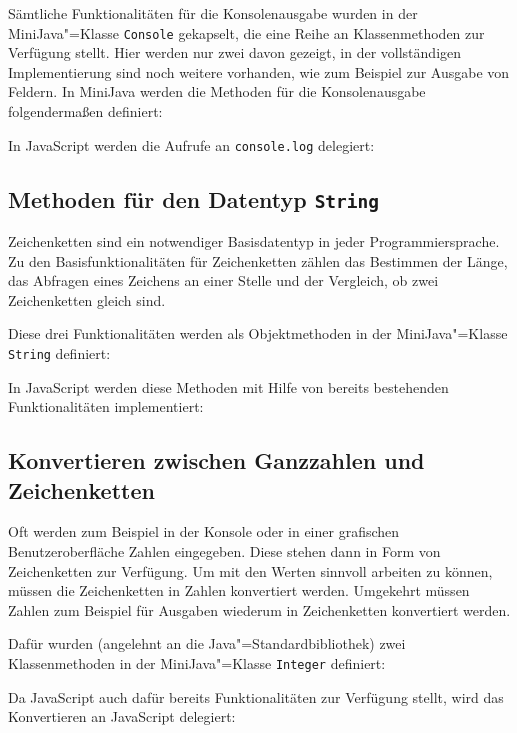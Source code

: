 Sämtliche Funktionalitäten für die Konsolenausgabe wurden in der MiniJava"=Klasse \lstinline{Console} gekapselt, die eine Reihe an Klassenmethoden zur Verfügung stellt. Hier werden nur zwei davon gezeigt, in der vollständigen Implementierung sind noch weitere vorhanden, wie zum Beispiel zur Ausgabe von Feldern. In MiniJava werden die Methoden für die Konsolenausgabe folgendermaßen definiert:


In JavaScript werden die Aufrufe an \lstinline{console.log} delegiert:


\subsection{Methoden für den Datentyp \lstinline{String}}

Zeichenketten sind ein notwendiger Basisdatentyp in jeder Programmiersprache. Zu den Basisfunktionalitäten für Zeichenketten zählen das Bestimmen der Länge, das Abfragen eines Zeichens an einer Stelle und der Vergleich, ob zwei Zeichenketten gleich sind.

Diese drei Funktionalitäten werden als Objektmethoden in der MiniJava"=Klasse \lstinline{String} definiert:


In JavaScript werden diese Methoden mit Hilfe von bereits bestehenden Funktionalitäten implementiert:


\subsection{Konvertieren zwischen Ganzzahlen und Zeichenketten}

Oft werden zum Beispiel in der Konsole oder in einer grafischen Benutzeroberfläche Zahlen eingegeben. Diese stehen dann in Form von Zeichenketten zur Verfügung. Um mit den Werten sinnvoll arbeiten zu können, müssen die Zeichenketten in Zahlen konvertiert werden. Umgekehrt müssen Zahlen zum Beispiel für Ausgaben wiederum in Zeichenketten konvertiert werden.

Dafür wurden (angelehnt an die Java"=Standardbibliothek) zwei Klassenmethoden in der MiniJava"=Klasse \lstinline{Integer} definiert:


\pagebreak
Da JavaScript auch dafür bereits Funktionalitäten zur Verfügung stellt, wird das Konvertieren an JavaScript delegiert:


